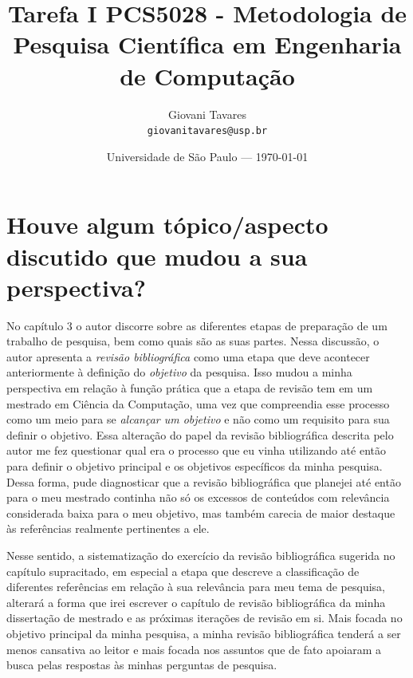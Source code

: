 \documentclass{article}
\title{Tarefa I PCS5028 - Metodologia de Pesquisa Científica em Engenharia de Computação} %
\author{Giovani Tavares\\ \texttt{giovanitavares@usp.br}} %
\date{Universidade de São Paulo --- \today} %
\begin{document}
\maketitle %


\section*{Houve algum tópico/aspecto discutido que mudou a sua perspectiva? } %

No capítulo 3  o autor discorre sobre as diferentes etapas de preparação de um trabalho de pesquisa, bem como quais são as suas partes. Nessa discussão, o autor apresenta a \textit{revisão bibliográfica} como uma etapa que deve acontecer anteriormente à definição do \textit{objetivo} da pesquisa. Isso mudou a minha perspectiva em relação à função prática que a etapa de revisão tem em um mestrado em Ciência da Computação, uma vez que compreendia esse processo como um meio para se \textit{alcançar um objetivo} e não como um requisito para sua definir o objetivo. Essa alteração do papel da revisão bibliográfica descrita pelo autor me fez questionar qual era o processo que eu vinha utilizando até então para definir o objetivo principal e os objetivos específicos da minha pesquisa. Dessa forma, pude diagnosticar que a revisão bibliográfica que planejei até então para o meu mestrado continha não só os excessos de conteúdos com relevância considerada baixa para o meu objetivo, mas também carecia de maior destaque às referências realmente pertinentes a ele.


Nesse sentido, a sistematização do exercício da revisão bibliográfica sugerida no capítulo supracitado, em especial a etapa que descreve a classificação de diferentes referências em relação à sua relevância para meu tema de pesquisa, alterará a forma que irei escrever o capítulo de revisão bibliográfica da minha dissertação de mestrado e as próximas iterações de revisão em si. Mais focada no objetivo principal da minha pesquisa, a minha revisão bibliográfica tenderá a ser menos cansativa ao leitor e mais focada nos assuntos que de fato apoiaram a busca pelas respostas às minhas perguntas de pesquisa.
\end{document}
